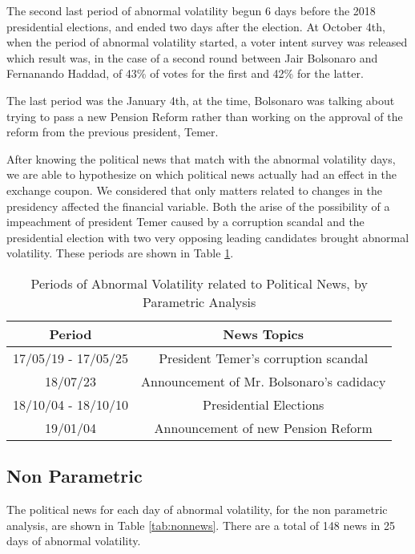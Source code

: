 \documentclass[cic,tc, english]{iiufrgs}
\begin{document}
    The second last period of abnormal volatility begun 6 days before the 2018 presidential elections, and ended two days after the election. At October 4th, when the period of abnormal volatility started, a voter intent survey was released which result was, in the case of a second round between Jair Bolsonaro and Fernanando Haddad, of 43\% of votes for the first and 42\% for the latter.

    The last period was the January 4th, at the time, Bolsonaro was talking about trying to pass a new Pension Reform rather than working on the approval of the reform from the previous president, Temer.

    After knowing the political news that match with the abnormal volatility days, we are able to hypothesize on which political news actually had an effect in the exchange coupon. We considered that only matters related to changes in the presidency affected the financial variable. Both the arise of the possibility of a impeachment of president Temer caused by a corruption scandal and the presidential election with two very opposing leading candidates brought abnormal volatility. These periods are shown in Table \ref{tab:respar}.

    \begin{table}[H]
        \caption{Periods of Abnormal Volatility related to Political News, by Parametric Analysis}
        \label{tab:respar}
        \centering
        \begin{tabular}{| c | c |}
            \hline
            Period & News Topics \\
            \hline \hline
            17/05/19 - 17/05/25 & President Temer's corruption scandal \\
            \hline
            18/07/23 & Announcement of Mr. Bolsonaro's cadidacy \\
            \hline
            18/10/04 - 18/10/10 & Presidential Elections \\
            \hline
            19/01/04 & Announcement of new Pension Reform \\
            \hline
        \end{tabular}
    \end{table}

\subsection{Non Parametric}

    The political news for each day of abnormal volatility, for the non parametric analysis, are shown in Table \ref{tab:nonnews}. There are a total of 148 news in 25 days of abnormal volatility.
\end{document}
